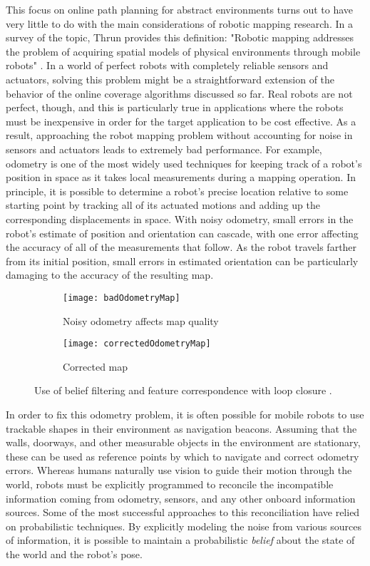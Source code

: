 This focus on online path planning for abstract environments turns out to have very little to do with the main considerations of robotic mapping research. In a survey of the topic, Thrun provides this definition: "Robotic mapping addresses the problem of acquiring spatial models of physical environments through mobile robots" \cite{Thrun}. In a world of perfect robots with completely reliable sensors and actuators, solving this problem might be a straightforward extension of the behavior of the online coverage algorithms discussed so far. Real robots are not perfect, though, and this is particularly true in applications where the robots must be inexpensive in order for the target application to be cost effective. As a result, approaching the robot mapping problem without accounting for noise in sensors and actuators leads to extremely bad performance. For example, odometry is one of the most widely used techniques for keeping track of a robot's position in space as it takes local measurements during a mapping operation. In principle, it is possible to determine a robot's precise location relative to some starting point by tracking all of its actuated motions and adding up the corresponding displacements in space. With noisy odometry, small errors in the robot's estimate of position and orientation can cascade, with one error affecting the accuracy of all of the measurements that follow. As the robot travels farther from its initial position, small errors in estimated orientation can be particularly damaging to the accuracy of the resulting map.

\begin{figure}[H]
\begin{subfigure}{.5\textwidth}
  \centering
  \texttt{[image: badOdometryMap]}
  \caption{Noisy odometry affects map quality}
\end{subfigure}
\begin{subfigure}{.5\textwidth}
  \centering
  \texttt{[image: correctedOdometryMap]}
  \caption{Corrected map}
\end{subfigure}
\caption[Odometry Errors and Corrected Map]{Use of belief filtering and feature correspondence with loop closure \cite{Thrun}.}
\end{figure}

In order to fix this odometry problem, it is often possible for mobile robots to use trackable shapes in their environment as navigation beacons. Assuming that the walls, doorways, and other measurable objects in the environment are stationary, these can be used as reference points by which to navigate and correct odometry errors. Whereas humans naturally use vision to guide their motion through the world, robots must be explicitly programmed to reconcile the incompatible information coming from odometry, sensors, and any other onboard information sources. Some of the most successful approaches to this reconciliation have relied on probabilistic techniques. By explicitly modeling the noise from various sources of information, it is possible to maintain a probabilistic \textit{belief} about the state of the world and the robot's pose.

